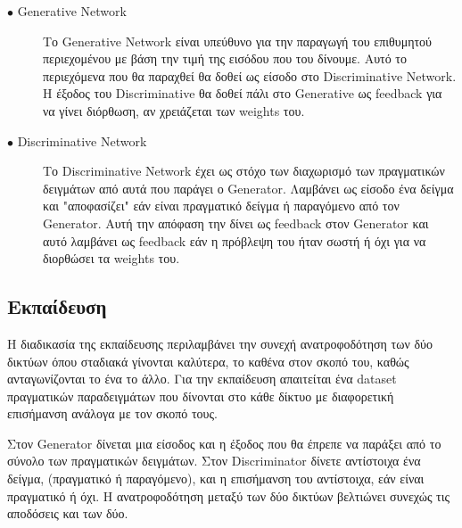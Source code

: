 \begin{description}

\item[$\bullet$ Generative Network] Το Generative Network είναι υπεύθυνο για την παραγωγή του επιθυμητού περιεχομένου με βάση την τιμή της εισόδου που του δίνουμε. Αυτό το περιεχόμενα που θα παραχθεί θα δοθεί ως είσοδο στο Discriminative Network. H έξοδος του Discriminative θα δοθεί πάλι στο Generative ως feedback για να γίνει διόρθωση, αν χρειάζεται των weights του.

\item[$\bullet$ Discriminative Network] Το Discriminative Network έχει ως στόχο των διαχωρισμό των πραγματικών δειγμάτων από αυτά που παράγει ο Generator. Λαμβάνει ως είσοδο ένα δείγμα και "αποφασίζει" εάν είναι πραγματικό δείγμα ή παραγόμενο από τον Generator. Αυτή την απόφαση την δίνει ως feedback στον Generator και αυτό λαμβάνει ως feedback εάν η πρόβλεψη του ήταν σωστή ή όχι για να διορθώσει τα weights του.

\end{description}

\subsection{Εκπαίδευση}
H διαδικασία της εκπαίδευσης περιλαμβάνει την συνεχή ανατροφοδότηση των δύο δικτύων όπου σταδιακά γίνονται καλύτερα, το καθένα στον σκοπό του, καθώς ανταγωνίζονται το ένα το άλλο. Για την εκπαίδευση απαιτείται ένα dataset πραγματικών παραδειγμάτων που δίνονται στο κάθε δίκτυο με διαφορετική επισήμανση ανάλογα με τον σκοπό τους.
\par
Στον Generator δίνεται μια είσοδος και η έξοδος που θα έπρεπε να παράξει από το σύνολο των πραγματικών δειγμάτων. Στον Discriminator δίνετε αντίστοιχα ένα δείγμα, (πραγματικό ή παραγόμενο), και η επισήμανση του αντίστοιχα, εάν είναι πραγματικό ή όχι. Η ανατροφοδότηση μεταξύ των δύο δικτύων βελτιώνει συνεχώς τις αποδόσεις και των δύο.


